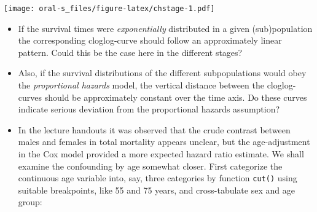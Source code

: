 \documentclass[
]{book}
\newenvironment{Shaded}{\begin{snugshade}}{\end{snugshade}}
\newcommand{\AttributeTok}[1]{\textcolor[rgb]{0.13,0.29,0.53}{#1}}
\newcommand{\DecValTok}[1]{\textcolor[rgb]{0.00,0.00,0.81}{#1}}
\newcommand{\FloatTok}[1]{\textcolor[rgb]{0.00,0.00,0.81}{#1}}
\newcommand{\FunctionTok}[1]{\textcolor[rgb]{0.13,0.29,0.53}{\textbf{#1}}}
\newcommand{\NormalTok}[1]{#1}
\newcommand{\SpecialCharTok}[1]{\textcolor[rgb]{0.81,0.36,0.00}{\textbf{#1}}}
\newcommand{\StringTok}[1]{\textcolor[rgb]{0.31,0.60,0.02}{#1}}
\begin{document}
\begin{Shaded}
\end{Shaded}

\texttt{[image: oral-s\_files/figure-latex/chstage-1.pdf]}

\begin{itemize}
\item
  If the survival times were \emph{exponentially}
  distributed in a given (sub)population
  the corresponding cloglog-curve should follow an approximately linear pattern.
  Could this be the case here in the different stages?
\item
  Also, if the survival distributions of the different subpopulations would
  obey the \emph{proportional hazards} model, the vertical distance between the
  cloglog-curves should be approximately constant over the time axis.
  Do these curves indicate serious deviation from the proportional hazards assumption?
\item
  In the lecture handouts it was observed that
  the crude contrast between males and females in total mortality appears
  unclear, but the age-adjustment in the Cox model provided a more
  expected hazard ratio estimate.
  We shall examine the confounding by age somewhat closer.
  First categorize the continuous age variable
  into, say, three categories by function \texttt{cut()}
  using suitable breakpoints, like 55 and 75 years, and
  cross-tabulate sex and age group:
\end{itemize}
\end{document}

